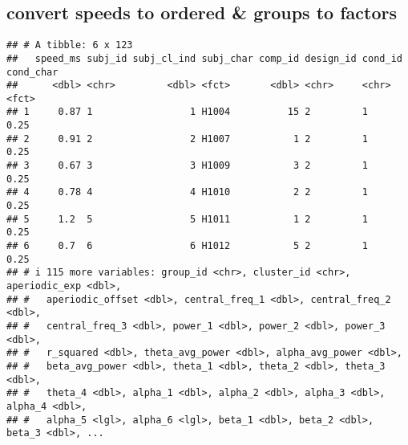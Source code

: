 \documentclass[
]{article}
\newenvironment{Shaded}{\begin{snugshade}}{\end{snugshade}}
\newcommand{\AttributeTok}[1]{\textcolor[rgb]{0.13,0.29,0.53}{#1}}
\newcommand{\ConstantTok}[1]{\textcolor[rgb]{0.56,0.35,0.01}{#1}}
\newcommand{\DecValTok}[1]{\textcolor[rgb]{0.00,0.00,0.81}{#1}}
\newcommand{\FunctionTok}[1]{\textcolor[rgb]{0.13,0.29,0.53}{\textbf{#1}}}
\newcommand{\NormalTok}[1]{#1}
\newcommand{\OtherTok}[1]{\textcolor[rgb]{0.56,0.35,0.01}{#1}}
\newcommand{\SpecialCharTok}[1]{\textcolor[rgb]{0.81,0.36,0.00}{\textbf{#1}}}
\newcommand{\StringTok}[1]{\textcolor[rgb]{0.31,0.60,0.02}{#1}}
\begin{document}
\hypertarget{convert-speeds-to-ordered-groups-to-factors}{%
\subsection{convert speeds to ordered \& groups to
factors}\label{convert-speeds-to-ordered-groups-to-factors}}

\begin{Shaded}
\end{Shaded}

\begin{verbatim}
## # A tibble: 6 x 123
##   speed_ms subj_id subj_cl_ind subj_char comp_id design_id cond_id cond_char
##      <dbl> <chr>         <dbl> <fct>       <dbl> <chr>     <chr>   <fct>    
## 1     0.87 1                 1 H1004          15 2         1       0.25     
## 2     0.91 2                 2 H1007           1 2         1       0.25     
## 3     0.67 3                 3 H1009           3 2         1       0.25     
## 4     0.78 4                 4 H1010           2 2         1       0.25     
## 5     1.2  5                 5 H1011           1 2         1       0.25     
## 6     0.7  6                 6 H1012           5 2         1       0.25     
## # i 115 more variables: group_id <chr>, cluster_id <chr>, aperiodic_exp <dbl>,
## #   aperiodic_offset <dbl>, central_freq_1 <dbl>, central_freq_2 <dbl>,
## #   central_freq_3 <dbl>, power_1 <dbl>, power_2 <dbl>, power_3 <dbl>,
## #   r_squared <dbl>, theta_avg_power <dbl>, alpha_avg_power <dbl>,
## #   beta_avg_power <dbl>, theta_1 <dbl>, theta_2 <dbl>, theta_3 <dbl>,
## #   theta_4 <dbl>, alpha_1 <dbl>, alpha_2 <dbl>, alpha_3 <dbl>, alpha_4 <dbl>,
## #   alpha_5 <lgl>, alpha_6 <lgl>, beta_1 <dbl>, beta_2 <dbl>, beta_3 <dbl>, ...
\end{verbatim}
\end{document}
